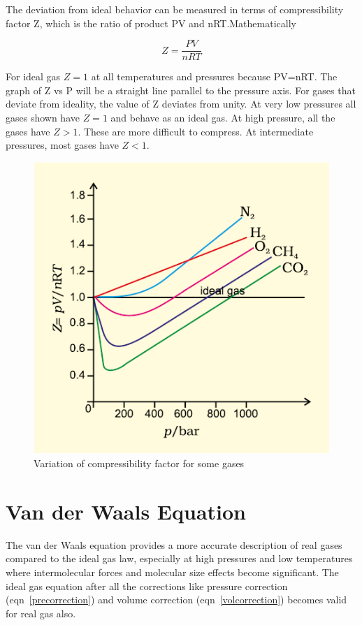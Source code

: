 \documentclass[12pt,a4paper]{article}
\begin{document}
The deviation from ideal behavior can be measured in terms of compressibility factor Z, which is the ratio of product PV and nRT.Mathematically

\begin{equation}
    Z = \frac{PV}{nRT}
\end{equation}

For ideal gas $Z=1$ at all temperatures and pressures because PV=nRT. The graph of Z vs P will be a straight line parallel to the pressure axis. For gases that deviate from ideality, the value of Z deviates from unity. At very low pressures all gases shown have $Z=1$ and behave as an ideal gas. At high pressure, all the gases have $Z > 1$. These are more difficult to compress. At intermediate pressures, most gases have $Z<1$.

\begin{figure}[h]
    \centering
    \includegraphics{Fig5_10.png}
    \caption{Variation of compressibility factor for some gases}
    \label{fig:enter-label}
\end{figure}

\section{Van der Waals Equation}

The van der Waals equation provides a more accurate description of real gases compared to the ideal gas law, especially at high pressures and low temperatures where intermolecular forces and molecular size effects become significant. The ideal gas equation after all the corrections like pressure correction (eqn~\ref{precorrection}) and volume correction (eqn~\ref{volcorrection}) becomes valid for real gas also. 
\end{document}

